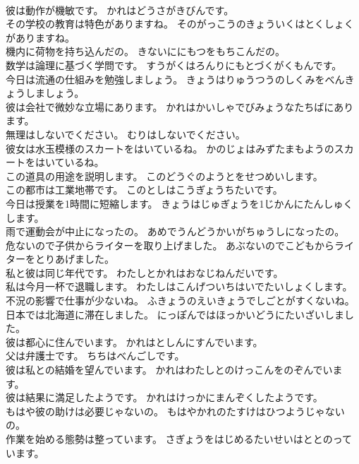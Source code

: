 \documentclass[8pt]{extreport}
\begin{document}
\begin{CJK}{UTF8}{min}
\\	彼は動作が機敏です。	かれはどうさがきびんです。 
\\	その学校の教育は特色がありますね。	そのがっこうのきょういくはとくしょくがありますね。 
\\	機内に荷物を持ち込んだの。	きないににもつをもちこんだの。 
\\	数学は論理に基づく学問です。	すうがくはろんりにもとづくがくもんです。 
\\	今日は流通の仕組みを勉強しましょう。	きょうはりゅうつうのしくみをべんきょうしましょう。 
\\	彼は会社で微妙な立場にあります。	かれはかいしゃでびみょうなたちばにあります。 
\\	無理はしないでください。	むりはしないでください。 
\\	彼女は水玉模様のスカートをはいているね。	かのじょはみずたまもようのスカートをはいているね。 
\\	この道具の用途を説明します。	このどうぐのようとをせつめいします。 
\\	この都市は工業地帯です。	このとしはこうぎょうちたいです。 
\\	今日は授業を1時間に短縮します。	きょうはじゅぎょうを1じかんにたんしゅくします。 
\\	雨で運動会が中止になったの。	あめでうんどうかいがちゅうしになったの。 
\\	危ないので子供からライターを取り上げました。	あぶないのでこどもからライターをとりあげました。 
\\	私と彼は同じ年代です。	わたしとかれはおなじねんだいです。 
\\	私は今月一杯で退職します。	わたしはこんげついちはいでたいしょくします。 
\\	不況の影響で仕事が少ないね。	ふきょうのえいきょうでしごとがすくないね。 
\\	日本では北海道に滞在しました。	にっぽんではほっかいどうにたいざいしました。 
\\	彼は都心に住んでいます。	かれはとしんにすんでいます。 
\\	父は弁護士です。	ちちはべんごしです。 
\\	彼は私との結婚を望んでいます。	かれはわたしとのけっこんをのぞんでいます。 
\\	彼は結果に満足したようです。	かれはけっかにまんぞくしたようです。 
\\	もはや彼の助けは必要じゃないの。	もはやかれのたすけはひつようじゃないの。 
\\	作業を始める態勢は整っています。	さぎょうをはじめるたいせいはととのっています。 

\end{CJK}
\end{document}
